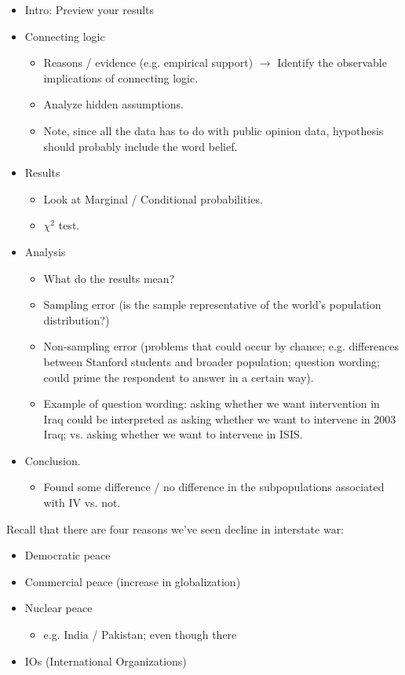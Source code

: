\documentclass{article}
\begin{document}
\begin{itemize}
  \item Intro: Preview your results
  \item Connecting logic 
    \begin{itemize}
      \item Reasons / evidence (e.g. empirical support) $\to$ Identify the observable implications of connecting logic.
      \item Analyze hidden assumptions.
      \item Note, since all the data has to do with public opinion data, hypothesis should probably include the word belief.
    \end{itemize}
  \item Results
    \begin{itemize}
      \item Look at Marginal / Conditional probabilities.
      \item $\chi^2$ test.
    \end{itemize}
  \item Analysis
    \begin{itemize}
      \item What do the results mean?
      \item Sampling error (is the sample representative of the world's population distribution?)
      \item Non-sampling error (problems that could occur by chance; e.g. differences between Stanford students and broader population; question wording; could prime the respondent to answer in a certain way).
      \item Example of question wording: asking whether we want intervention in Iraq could be interpreted as asking whether we want to intervene in 2003 Iraq; vs. asking whether we want to intervene in ISIS.
    \end{itemize}
  \item Conclusion.
    \begin{itemize}
      \item Found some difference / no difference in the subpopulations associated with IV vs. not.
    \end{itemize}
\end{itemize}

Recall that there are four reasons we've seen decline in interstate war:

\begin{itemize}
  \item Democratic peace
  \item Commercial peace (increase in globalization)
  \item Nuclear peace
    \begin{itemize}
      \item e.g. India / Pakistan; even though there 
    \end{itemize}
  \item IOs (International Organizations)
\end{itemize}
\end{document}
